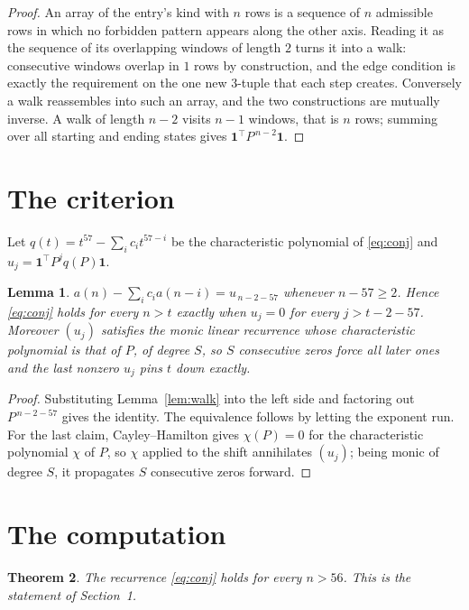 \documentclass[11pt,a4paper]{article}
\theoremstyle{plain}
\newtheorem{theorem}{Theorem}
\newtheorem{lemma}[theorem]{Lemma}
\theoremstyle{definition}
\begin{document}
\begin{proof}
An array of the entry's kind with $n$ rows is a sequence of $n$ admissible rows in
which no forbidden pattern appears along the other axis. Reading it as the sequence of its
overlapping windows of length $2$ turns it into a walk: consecutive windows overlap in
$1$ rows by construction, and the edge condition is exactly the requirement on the one
new $3$-tuple that each step creates. Conversely a walk reassembles into such an array,
and the two constructions are mutually inverse. A walk of length $n-2$ visits $n-1$
windows, that is $n$ rows; summing over all starting and ending states gives
$\mathbf{1}^{\!\top}P^{\,n-2}\mathbf{1}$.
\end{proof}

\section{The criterion}

Let $q(t)=t^{57}-\sum_i c_i t^{57-i}$ be the characteristic polynomial of
\eqref{eq:conj} and $u_j=\mathbf{1}^{\!\top}P^{j}q(P)\mathbf{1}$.

\begin{lemma}\label{lem:crit}
$a(n)-\sum_i c_i a(n-i)=u_{\,n-2-57}$ whenever $n-57\ge2$. Hence
\eqref{eq:conj} holds for every $n>t$ exactly when $u_j=0$ for every
$j>t-2-57$. Moreover $(u_j)$ satisfies the monic linear recurrence whose
characteristic polynomial is that of $P$, of degree $S$, so $S$ consecutive zeros force all
later ones and the last nonzero $u_j$ pins $t$ down exactly.
\end{lemma}

\begin{proof}
Substituting Lemma~\ref{lem:walk} into the left side and factoring out
$P^{\,n-2-57}$ gives the identity. The equivalence follows by letting the exponent
run. For the last claim, Cayley--Hamilton gives $\chi(P)=0$ for the characteristic
polynomial $\chi$ of $P$, so $\chi$ applied to the shift annihilates $(u_j)$; being monic of
degree $S$, it propagates $S$ consecutive zeros forward.
\end{proof}

\section{The computation}

\begin{theorem}
The recurrence \eqref{eq:conj} holds for every $n>56$. This is the statement of
Section~1.
\end{theorem}
\end{document}
